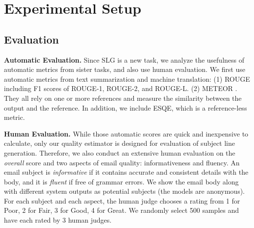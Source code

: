 \documentclass[11pt,a4paper]{article}
\newcommand{\esqe}{{\sc ESQE}\xspace}
\begin{document}
\section{Experimental Setup}
\subsection{Evaluation}
\label{sec:metric}
\noindent \textbf{Automatic Evaluation.}
Since SLG is a new task, we analyze the usefulness of automatic metrics from sister tasks, and also use human evaluation.
We first use automatic metrics from text summarization and machine translation: (1) ROUGE \cite{lin2004rouge} including F1 scores of ROUGE-1, ROUGE-2, and ROUGE-L. (2) METEOR \cite{denkowski2014meteor}.
They all rely on one or more references and measure the similarity between the output and the reference.
In addition, we include \esqe, which is a reference-less metric.

\noindent \textbf{Human Evaluation.}
While those automatic scores are quick and inexpensive to calculate, only our quality estimator is designed for evaluation of subject line generation.
Therefore, we also conduct an extensive human evaluation on the \textit{overall} score and two aspects of email quality: informativeness and fluency.
An email subject is \textit{informative} if it contains accurate and consistent details with the body, and it is \textit{fluent} if free of grammar errors.
We show the email body along with different system outputs as potential subjects (the models are anonymous).
For each subject and each aspect, the human judge chooses a rating from 1 for Poor, 2 for Fair, 3 for Good, 4 for Great.
We randomly select 500 samples and have each rated by 3 human judges.
\end{document}
